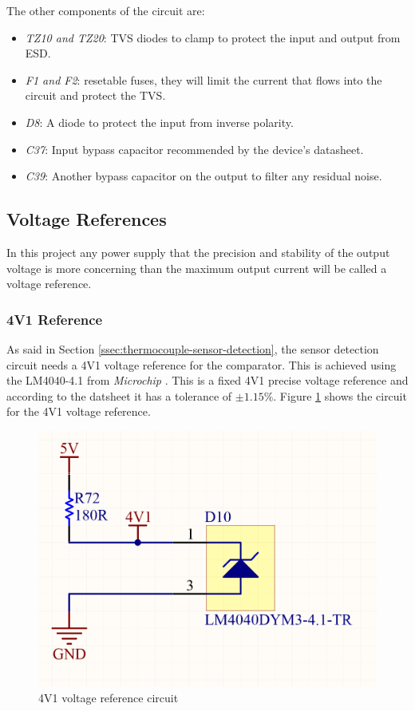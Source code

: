 			The other components of the circuit are:

			\begin{itemize}
				\item\textit{TZ10 and TZ20}: TVS diodes to clamp to protect the input and output from ESD.
				\item\textit{F1 and F2}: resetable fuses, they will limit the current that flows into the circuit and protect the TVS.
				\item\textit{D8}: A diode to protect the input from inverse polarity.
				\item\textit{C37}: Input bypass capacitor recommended by the device's datasheet.
				\item\textit{C39}: Another bypass capacitor on the output to filter any residual noise.
			\end{itemize}

	\subsection{Voltage References}\label{ssec:voltage-references}

		In this project any power supply that the precision and stability of the output voltage is more concerning than the maximum output current will be called a voltage reference.

		\subsubsection{4V1 Reference}\label{sssec:4v1-reference}

			As said in Section \ref{ssec:thermocouple-sensor-detection}, the sensor detection circuit needs a 4V1 voltage reference for the comparator. This is achieved using the LM4040-4.1 from \textit{Microchip} \cite{lm4040-datasheet}. This is a fixed 4V1 precise voltage reference and according to the datsheet it has a tolerance of $\pm1.15\%$. Figure \ref{fig:4v1-voltage-ref} shows the circuit for the 4V1 voltage reference.

			\begin{figure}[htbp]
				\centering
					\includegraphics[width=.8\textwidth]{figuras/fig-4v1-voltage-ref}
				\caption{4V1 voltage reference circuit}
				\label{fig:4v1-voltage-ref}
			\end{figure}

